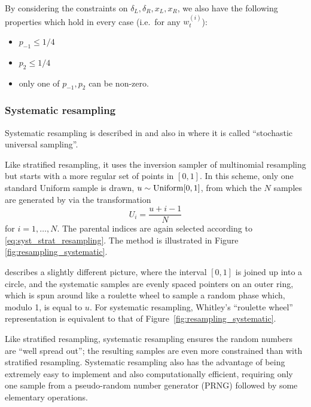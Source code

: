 By considering the constraints on $\delta_L, \delta_R, x_L, x_R$, we also have the following properties which hold in every case (i.e.\ for any $w_t^{(i)}$):
\begin{itemize}
\item $p_{-1} \leq 1/4$
\item $p_{2} \leq 1/4$
\item only one of $p_{-1}, p_2$ can be non-zero.
\end{itemize}




\subsubsection{Systematic resampling \seb{$\checkmark$} }%
Systematic resampling is described in \textcite{carpenter1999} and also in \textcite{whitley1994} where it is called ``stochastic universal sampling''.

Like stratified resampling, it uses the inversion sampler of multinomial resampling but starts with a more regular set of points in $[0,1]$.
In this scheme, only one standard Uniform sample is drawn, $u \sim \operatorname{Uniform}[0,1]$, from which the $N$ samples are generated by via the transformation
\begin{equation*}
U_i = \frac{u+ i-1}{N}
\end{equation*}
for $i = 1, \dots, N $.
The parental indices are again selected according to \eqref{eq:syst_strat_resampling}. 
The method is illustrated in Figure \ref{fig:resampling_systematic}.

\textcite{whitley1994} describes a slightly different picture, where the interval $[0,1]$ is joined up into a circle, and the systematic samples are evenly spaced pointers on an outer ring, which is spun around like a roulette wheel to sample a random phase which, modulo 1, is equal to $u$.
For systematic resampling, Whitley's ``roulette wheel'' representation is equivalent to that of Figure~\ref{fig:resampling_systematic}.

Like stratified resampling, systematic resampling ensures the random numbers are ``well spread out''; the resulting samples are even more constrained than with stratified resampling. 
Systematic resampling also has the advantage of being extremely easy to implement and also computationally efficient, requiring only one sample from a pseudo-random number generator (PRNG) followed by some elementary operations.

